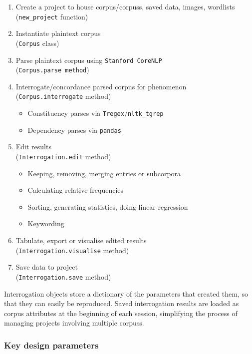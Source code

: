\begin{enumerate}
    \item Create a project to house corpus\slash \glspl{corpus}, saved data, images, wordlists \\ (\texttt{new\_project} function)
    \item Instantiate plaintext corpus \\ (\texttt{Corpus} class)
    \item Parse plaintext corpus using \texttt{Stanford CoreNLP} \\ (\texttt{Corpus.parse method})
    \item Interrogate\slash concordance parsed corpus for  phenomenon \\ (\texttt{Corpus.interrogate} method)
    \begin{itemize}
        \item Constituency parses via \texttt{Tregex}\slash \texttt{nltk\_tgrep}
        \item Dependency parses via \texttt{pandas}
    \end{itemize}
    \item Edit results \\ (\texttt{Interrogation.edit} method)
    \begin{itemize}
        \item Keeping, removing, merging entries or subcorpora
        \item Calculating relative frequencies
        \item Sorting, generating statistics, doing linear regression
        \item Keywording
    \end{itemize}
    \item Tabulate, export or visualise edited results \\ (\texttt{Interrogation.visualise} method)
    \item Save data to project \\ (\texttt{Interrogation.save} method)
\end{enumerate}
%
Interrogation objects store a dictionary of the parameters that created them, so that they can easily be reproduced. Saved interrogation results are loaded as \gls{corpus} attributes at the beginning of each session, simplifying the process of managing projects involving multiple \glspl{corpus}.

\subsubsection{Key design parameters}


